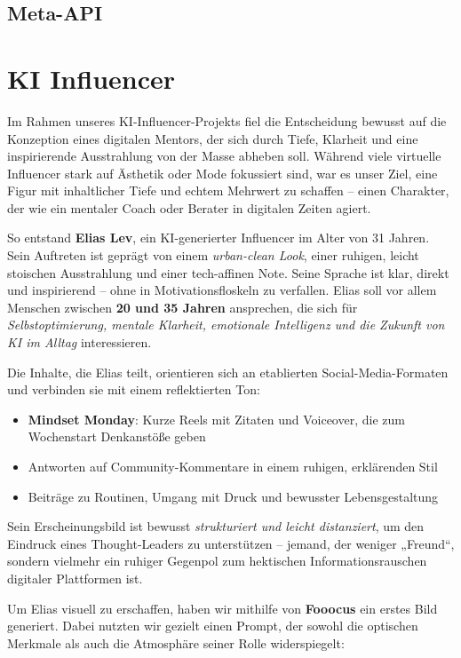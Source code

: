\documentclass[a4paper,12pt]{article}
\begin{document}
\subsection{Meta-API}


\section{KI Influencer}

Im Rahmen unseres KI-Influencer-Projekts fiel die Entscheidung bewusst auf die Konzeption eines digitalen Mentors, der sich durch Tiefe, Klarheit und eine inspirierende Ausstrahlung von der Masse abheben soll. Während viele virtuelle Influencer stark auf Ästhetik oder Mode fokussiert sind, war es unser Ziel, eine Figur mit inhaltlicher Tiefe und echtem Mehrwert zu schaffen – einen Charakter, der wie ein mentaler Coach oder Berater in digitalen Zeiten agiert.

So entstand \textbf{Elias Lev}, ein KI-generierter Influencer im Alter von 31 Jahren. Sein Auftreten ist geprägt von einem \textit{urban-clean Look}, einer ruhigen, leicht stoischen Ausstrahlung und einer tech-affinen Note. Seine Sprache ist klar, direkt und inspirierend – ohne in Motivationsfloskeln zu verfallen. Elias soll vor allem Menschen zwischen \textbf{20 und 35 Jahren} ansprechen, die sich für \textit{Selbstoptimierung, mentale Klarheit, emotionale Intelligenz und die Zukunft von KI im Alltag} interessieren.

Die Inhalte, die Elias teilt, orientieren sich an etablierten Social-Media-Formaten und verbinden sie mit einem reflektierten Ton:

\begin{itemize}
    \item \textbf{Mindset Monday}: Kurze Reels mit Zitaten und Voiceover, die zum Wochenstart Denkanstöße geben
    \item Antworten auf Community-Kommentare in einem ruhigen, erklärenden Stil
    \item Beiträge zu Routinen, Umgang mit Druck und bewusster Lebensgestaltung
\end{itemize}

Sein Erscheinungsbild ist bewusst \textit{strukturiert und leicht distanziert}, um den Eindruck eines Thought-Leaders zu unterstützen – jemand, der weniger „Freund“, sondern vielmehr ein ruhiger Gegenpol zum hektischen Informationsrauschen digitaler Plattformen ist.

Um Elias visuell zu erschaffen, haben wir mithilfe von \textbf{Fooocus} ein erstes Bild generiert. Dabei nutzten wir gezielt einen Prompt, der sowohl die optischen Merkmale als auch die Atmosphäre seiner Rolle widerspiegelt:
\end{document}
